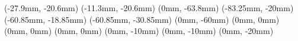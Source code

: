 \JoinCoffins \result \topBox
\JoinCoffins {} \badge[r, b](-27.9mm, -20.6mm)
\JoinCoffins {} \pku[l, b](-11.3mm, -20.6mm)
\JoinCoffins {} \headingText[hc, b](0mm, -63.8mm)
\JoinCoffins {} \titleText[l, t](-83.25mm, -20mm)
\JoinCoffins {} \chineseTitleText[l, t](-60.85mm, -18.85mm)
\JoinCoffins {} \chineseTitleTextSecondLine[l, t](-60.85mm, -30.85mm)
\JoinCoffins {} \nameText[hc, t](0mm, -60mm)
\JoinCoffins {} \studentIDText[hc, t](0mm, 0mm)
\JoinCoffins {} \schoolText[hc, t](0mm, 0mm)
\JoinCoffins {} \majorText[hc, t](0mm, 0mm)
\JoinCoffins {} \researchDirectionText[hc, t](0mm, -10mm)
\JoinCoffins {} \advisorText[hc, t](0mm, -10mm)
\JoinCoffins {} \dateText[hc, t](0mm, -20mm)


\thispagestyle{empty}
\noindent\TypesetCoffin \result
\restoregeometry